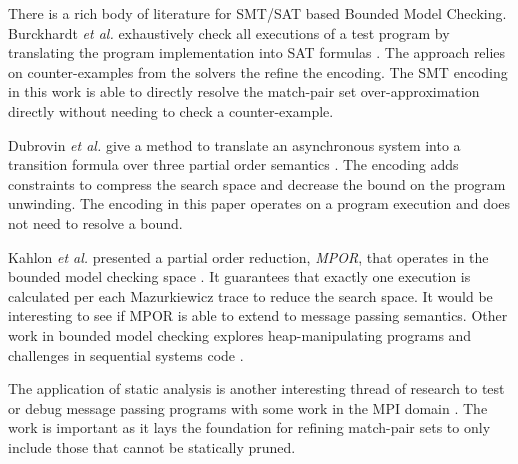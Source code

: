 There is a rich body of literature for SMT/SAT based Bounded Model
Checking. Burckhardt \emph{et al.} exhaustively check all executions of a
test program by translating the program implementation into SAT
formulas \cite{burckhardt:pldi07}. The approach relies on
counter-examples from the solvers the refine the encoding. The SMT
encoding in this work is able to directly resolve the match-pair set
over-approximation directly without needing to check a
counter-example.

Dubrovin \emph{et al.} give a method to translate an asynchronous system into
a transition formula over three partial order semantics
\cite{heljanko:scp}. The encoding adds constraints to compress the
search space and decrease the bound on the program unwinding. The
encoding in this paper operates on a program execution and does not
need to resolve a bound.

Kahlon \emph{et al.} presented a partial order reduction, \textit{MPOR}, that
operates in the bounded model checking space \cite{kahlon:cav09}.  It
guarantees that exactly one execution is calculated per each
Mazurkiewicz trace to reduce the search space. It would be interesting
to see if MPOR is able to extend to message passing semantics. Other
work in bounded model checking explores heap-manipulating programs and
challenges in sequential systems code \cite{lahiri:popl08, lahiri:cav11}.

The application of static analysis is another interesting thread of
research to test or debug message passing programs with some work in
the MPI domain \cite{zhang:ppopp07, greg:cgo09, gray:lctes11}. The
work is important as it lays the foundation for refining match-pair
sets to only include those that cannot be statically pruned.
